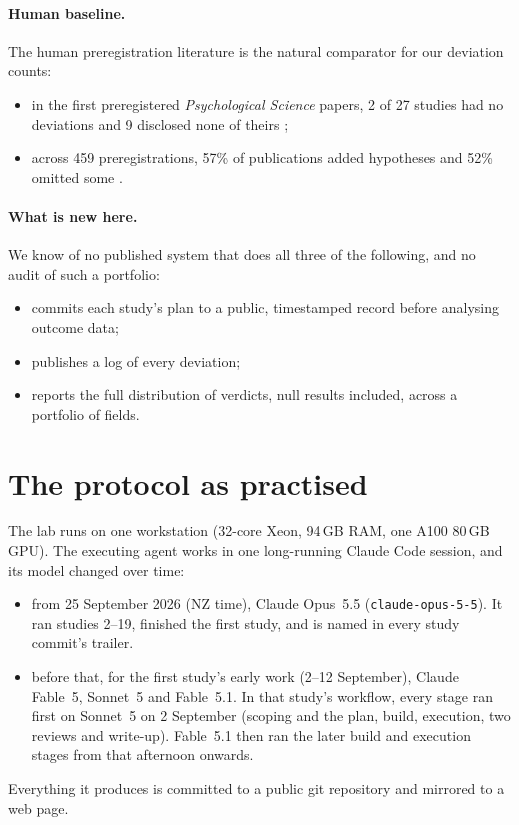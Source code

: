 \documentclass[11pt]{article}
\begin{document}
\paragraph{Human baseline.} The human preregistration literature is the natural comparator for our deviation counts:
\begin{itemize}
\item in the first preregistered \emph{Psychological Science} papers, 2 of 27 studies had no deviations and 9
disclosed none of theirs \citep{claesen2021dream};
\item across 459 preregistrations, 57\% of publications added hypotheses and 52\% omitted some
\citep{vandenakker2023selective}.
\end{itemize}

\paragraph{What is new here.} We know of no published system that does all three of the following, and no audit of
such a portfolio:
\begin{itemize}
\item commits each study's plan to a public, timestamped record before analysing outcome data;
\item publishes a log of every deviation;
\item reports the full distribution of verdicts, null results included, across a portfolio of fields.
\end{itemize}

\section{The protocol as practised}
\label{sec:protocol}

The lab runs on one workstation (32-core Xeon, 94\,GB RAM, one A100 80\,GB GPU). The executing agent works in one
long-running Claude Code session, and its model changed over time:
\begin{itemize}
\item from 25 September 2026 (NZ time), Claude Opus~5.5 (\texttt{claude-opus-5-5}). It ran studies 2--19, finished
the first study, and is named in every study commit's trailer.
\item before that, for the first study's early work (2--12 September), Claude Fable~5, Sonnet~5 and Fable~5.1. In
that study's workflow, every stage ran first on Sonnet~5 on 2 September (scoping and the plan, build, execution, two
reviews and write-up). Fable~5.1 then ran the later build and execution stages from that afternoon onwards.
\end{itemize}
Everything it produces is committed to a public git repository and mirrored to a web page.
\end{document}
